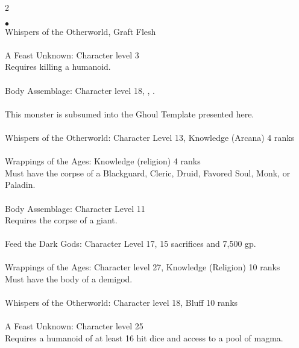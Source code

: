 \begin{multicols}{2}
\begin{small}
\begin{list}{$\bullet$}{\itemspace}
\\
Whispers of the Otherworld, Graft Flesh\\
\\
A Feast Unknown: Character level 3\\
Requires killing a humanoid.\\
\\
Body Assemblage: Character level 18, , .\\
\\
This monster is subsumed into the Ghoul Template presented here.\\
\\
Whispers of the Otherworld: Character Level 13, Knowledge (Arcana) 4 ranks\\
\\
Wrappings of the Ages: Knowledge (religion) 4 ranks\\
Must have the corpse of a Blackguard, Cleric, Druid, Favored Soul, Monk, or Paladin.\\
\\
Body Assemblage: Character Level 11\\
Requires the corpse of a giant.\\
\\
Feed the Dark Gods: Character Level 17, 15 sacrifices and 7,500 gp.\\
\\
Wrappings of the Ages: Character level 27, Knowledge (Religion) 10 ranks\\
Must have the body of a demigod.\\
\\
Whispers of the Otherworld: Character level 18, Bluff 10 ranks\\
\\
A Feast Unknown: Character level 25\\
Requires a humanoid of at least 16 hit dice and access to a pool of magma.\\

\end{list}
\end{small}
\end{multicols}
